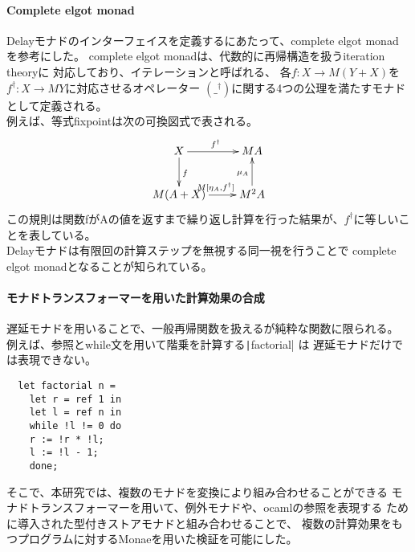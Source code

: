 \documentclass[japanese]{jssst_ppl}
\theoremstyle{definition}
\begin{document}
\paragraph{Complete elgot monad}
Delayモナドのインターフェイスを定義するにあたって、complete elgot monad\cite{ADAMEK20101306}
を参考にした。
complete elgot monadは、代数的に再帰構造を扱うiteration theory\cite{1993Bloom}に
対応しており、イテレーションと呼ばれる、
各$f : X \rightarrow M (Y + X)$を$f^{\dagger} : X \rightarrow M Y$に対応させるオペレーター
$(\_^{\dagger})$に関する4つの公理を満たすモナドとして定義される。\\
例えば、等式fixpointは次の可換図式で表される。
\xymatrixcolsep{2.5cm}
\[
  \xymatrix{
  X \ar[r]^{f^{\dagger}} \ar[d]^{f} & M A  \\
  M (A + X) \ar[r]^{M[\eta_A, f^{\dagger}]}  & M^2 A \ar[u]^{\mu_A}
  }
\]
この規則は関数fがAの値を返すまで繰り返し計算を行った結果が、$f^{\dagger}$に等しいことを表している。\\
Delayモナドは有限回の計算ステップを無視する同一視を行うことで
complete elgot monadとなることが知られている\cite{10.1007/978-3-319-67729-3_3}。

\paragraph{モナドトランスフォーマーを用いた計算効果の合成}
遅延モナドを用いることで、一般再帰関数を扱えるが純粋な関数に限られる。
例えば、参照とwhile文を用いて階乗を計算する\texttt|factorial| は
遅延モナドだけでは表現できない。
\begin{verbatim}
  let factorial n =
    let r = ref 1 in
    let l = ref n in
    while !l != 0 do
    r := !r * !l;
    l := !l - 1;
    done;
\end{verbatim}
そこで、本研究では、複数のモナドを変換により組み合わせることができる
モナドトランスフォーマーを用いて、例外モナドや、ocamlの参照を表現する
ために導入された型付きストアモナド\cite{affeldt2023practicalformalizationmonadicequational}と組み合わせることで、
複数の計算効果をもつプログラムに対するMonaeを用いた検証を可能にした。
\end{document}
